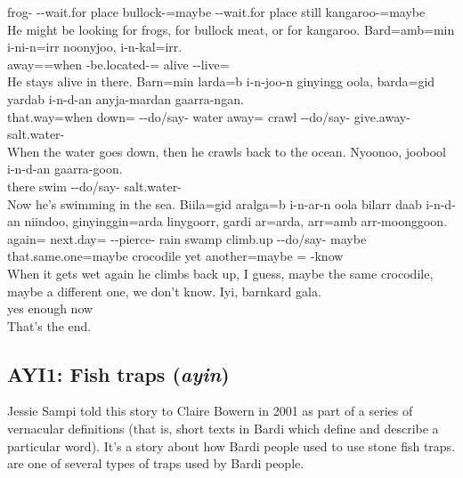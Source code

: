 \begin{exye}
frog- --wait.for place bullock-=maybe --wait.for place still kangaroo-=maybe\\
\ft He might be looking for frogs, for bullock meat, or for kangaroo.
\exy {}
\gll Bard=amb=min i-ni-n=irr noonyjoo, i-n-kal=irr.\\
away==when -be.located-= alive --live=\\
\ft He stays alive in there.
\exy {}
\gll Barn=min larda=b i-n-joo-n ginyingg oola, barda=gid yardab i-n-d-an anyja-mardan gaarra-ngan.\\
that.way=when down= --do/say-  water away= crawl --do/say- give.away- salt.water-\\
\ft When the water goes down, then he crawls back to the ocean.
\exy {}
\gll Nyoonoo, joobool i-n-d-an gaarra-goon.\\
there swim --do/say- salt.water-\\
\ft Now he's swimming in the sea.
\exy {}
\gll Biila=gid aralga=b i-n-ar-n oola bilarr daab i-n-d-an niindoo, ginyinggin=arda linygoorr, gardi ar=arda, arr=amb arr-moonggoon.\\
again= next.day= --pierce- rain swamp climb.up --do/say- maybe that.same.one=maybe crocodile yet another=maybe = -know\\
\ft When it gets wet again he climbs back up, I guess, maybe the same crocodile, maybe a different one, we don't know.
\exy {}
\gll Iyi, barnkard gala.\\
yes enough now\\
\ft That's the end.
\end{exye}

\subsection{AYI1: Fish traps (\emph{ayin})}
Jessie Sampi told this story to Claire Bowern in 2001 as part of a series of vernacular definitions (that is, short texts in Bardi which define and describe a particular word). It's a story about how Bardi people used to use  stone fish traps.  are one of several types of traps used by Bardi people.

